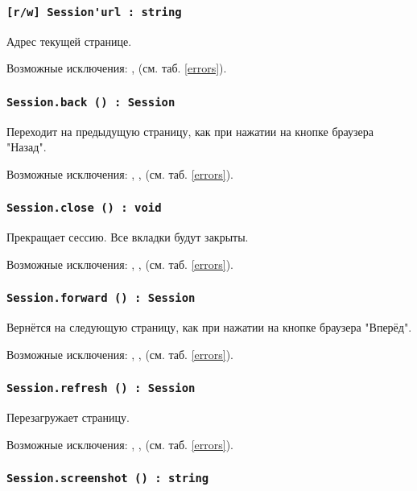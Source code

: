 \subsubsection{\lstinline|[r/w] Session'url : string|}

Адрес текущей странице.

Возможные исключения: ,  (см. таб. \ref{errors}).

\subsubsection{\lstinline|Session.back () : Session|}

Переходит на предыдущую страницу, как при нажатии на кнопке браузера "Назад".

Возможные исключения: , ,  (см. таб. \ref{errors}).

\subsubsection{\lstinline|Session.close () : void|}

Прекращает сессию. Все вкладки будут закрыты.

Возможные исключения: , ,  (см. таб. \ref{errors}).

\subsubsection{\lstinline|Session.forward () : Session|}

Вернётся на следующую страницу, как при нажатии на кнопке браузера "Вперёд".

Возможные исключения: , ,  (см. таб. \ref{errors}).

\subsubsection{\lstinline|Session.refresh () : Session|}

Перезагружает страницу.

Возможные исключения: , ,  (см. таб. \ref{errors}).

\subsubsection{\lstinline|Session.screenshot () : string|}

